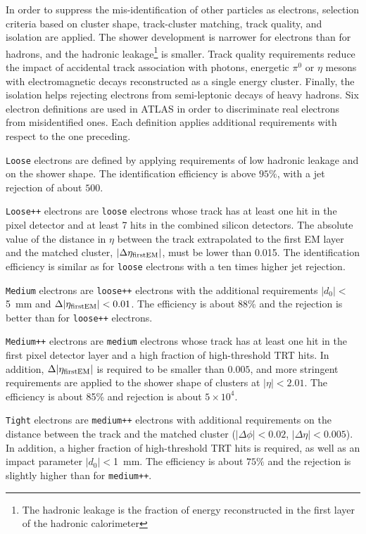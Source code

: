 In order to suppress the mis-identification of other particles  
as electrons, selection criteria based on cluster shape, 
track-cluster matching, track quality, and isolation are applied.
The shower development is narrower for electrons than for hadrons, and
the hadronic leakage\footnote{The hadronic leakage is the fraction of 
energy reconstructed in the first layer of the hadronic calorimeter}
is smaller. Track quality requirements reduce the impact of accidental 
track association with photons, energetic $\pi^0$ or $\eta$ mesons
with electromagnetic decays reconstructed as a single energy cluster.
Finally, the isolation helps rejecting electrons from semi-leptonic
decays of  heavy hadrons.
Six electron definitions are used in ATLAS in order to discriminate
real electrons from misidentified ones. Each definition applies
additional requirements with respect to the one preceding.

\texttt{Loose} electrons are defined by applying requirements of low
hadronic leakage and on the shower shape.
The identification efficiency is above $95\%$, with a jet
rejection of about $500$.

\texttt{Loose++} electrons are \texttt{loose} electrons whose track
has at least one hit in  the pixel detector and at least 7 hits in the
combined silicon detectors. The absolute value of the distance in
$\eta$ between the track extrapolated to the first EM layer and the
matched cluster, $|\Delta\eta_{\rm first EM}|$, must be lower than
0.015. The identification efficiency is similar as for \texttt{loose}
electrons with a ten times higher jet rejection.

\texttt{Medium} electrons are \texttt{loose++} electrons with
the additional requirements $|d_0|<$5~mm and $\Delta|\eta_{\rm first
  EM}|<0.01$. The efficiency is about 88\% and the rejection is better
than for \texttt{loose++} electrons.

\texttt{Medium++} electrons are \texttt{medium} electrons whose track
has at least one hit in the first pixel detector layer and a high
fraction of high-threshold TRT hits. In addition, $\Delta|\eta_{\rm
  first EM}|$ is required to be smaller than $0.005$, and more
stringent requirements are applied to the shower shape of clusters at
$|\eta|<2.01$. The efficiency is about 85\% and rejection is about
$5\times 10^4$.

\texttt{Tight} electrons are \texttt{medium++} electrons with
additional requirements on the distance between the track and the
matched cluster ($|\Delta\phi|<0.02$, $|\Delta\eta|<0.005$). 
In addition, a higher fraction of high-threshold TRT hits is required, as well as
 an impact parameter $|d_0|<$1~mm. 
The efficiency is about $75\%$ and the rejection is slightly higher
than for \texttt{medium++}.


